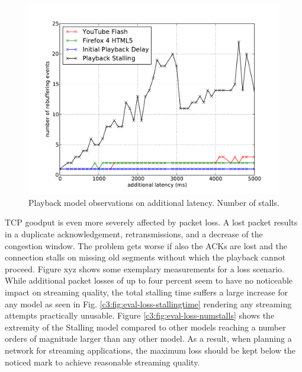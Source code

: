 \begin{figure}[htb]
    \centering
    \includegraphics[width=\textwidth]{images/eval-latency-frequency.pdf}
    \caption{Playback model observations on additional latency. Number of stalls.}
    \label{c3:fig:eval-latency-numstalls}
\end{figure}


TCP goodput is even more severely affected by packet loss. A lost packet results in a duplicate acknowledgement, retransmissions, and a decrease of the congestion window. The problem gets worse if also the ACKs are lost and the connection stalls on missing old segments without which the playback cannot proceed. Figure xyz shows some exemplary measurements for a loss scenario. While additional packet losses of up to four percent seem to have no noticeable impact on streaming quality, the total stalling time suffers a large increase for any model as seen in Fig. \ref{c3:fig:eval-loss-stallingtime} rendering any streaming attempts practically unusable. Figure \ref{c3:fig:eval-loss-numstalls} shows the extremity of the Stalling model compared to other models reaching a number orders of magnitude larger than any other model.
As a result, when planning a network for streaming applications, the maximum loss should be kept below the noticed mark to achieve reasonable streaming quality. 


